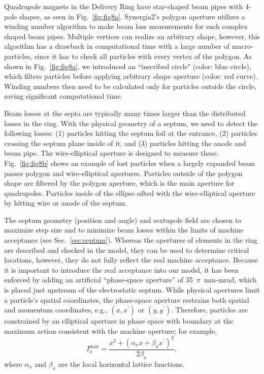 \documentclass[aps,prstab,showpacs,onecolumn,12pt]{revtex4-1}
\begin{document}
Quadrupole magnets in the Delivery Ring have star-shaped beam pipes with 4-pole shapes, as seen in Fig.~\ref{fig:fig8a}. Synergia2's polygon aperture utilizes a winding number algorithm to make beam loss measurements for such complex shaped beam pipes. 
Multiple vertices can realize an arbitrary shape, however, this algorithm has a drawback in computational time with a large number of macro-particles, since it has to check all particles with every vertex of the polygon. As shown in Fig.~\ref{fig:fig8a}, we introduced an ``inscribed circle" (color: blue circle), which filters particles before applying arbitrary shape aperture (color: red curve). Winding numbers then need to be calculated only for particles outside the circle, saving significant computational time.

Beam losses at the septa are typically many times larger than the distributed losses in the ring. With the physical geometry of a septum, we need to detect the following losses: (1) particles hitting the septum foil at the entrance, (2) particles crossing the septum plane inside of it, and (3) particles hitting the anode and beam pipe. The wire-elliptical aperture is designed to measure these. Fig.~\ref{fig:fig8b} shows an example of lost particles when a largely expanded beam passes polygon and wire-elliptical apertures.
Particles outside of the polygon shape are filtered by the polygon aperture, which is the main aperture for quadrupoles. Particles inside of the ellipse sifted with the wire-elliptical aperture by hitting wire or anode of the septum. 

The septum geometry (position and angle) and sextupole field are chosen to maximize step size and to minimize beam losses within the limits of machine acceptance (see Sec.~\ref{sec:septum}). Whereas the apertures of elements in the ring are described and checked in the model, they can be used to determine critical locations, however, they do not fully reflect the real machine acceptance. Because it is important to introduce the real acceptance into our model, it has been enforced by adding an artificial ``phase-space aperture'' of 35~$\pi$~mm-mrad, which is placed just upstream of the electrostatic septum. While physical apertures limit a particle's spatial coordinates, the phase-space aperture restrains both spatial and momentum coordinates, e.g., $(x, x^{\prime})$ or $(y, y^{\prime})$. Therefore, particles are constrained by an elliptical aperture in phase space with boundary at the maximum action consistent with the machine aperture; for example,
\begin{equation}
  I_{x}^{\text{max}} = \frac{x^{2} +  ( \alpha_{x} x + \beta_{x} x^{\prime} )^{2}}{2 \beta_{x}},
  \label{eqn:eqn6}
\end{equation}
where $\alpha_{x}$ and $\beta_{x}$ are the local horizontal lattice functions.
\end{document}
